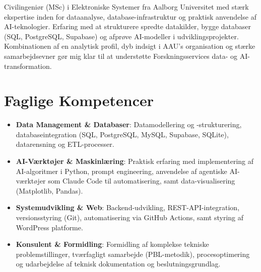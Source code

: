 \documentclass[11pt,a4paper,sans]{moderncv}
\begin{document}
\makecvtitle


\vspace{6pt}
\small{Civilingeniør (MSc) i Elektroniske Systemer fra Aalborg Universitet med stærk ekspertise inden for dataanalyse, database-infrastruktur og praktisk anvendelse af AI-teknologier. Erfaring med at strukturere spredte datakilder, bygge databaser (SQL, PostgreSQL, Supabase) og afprøve AI-modeller i udviklingsprojekter. Kombinationen af en analytisk profil, dyb indsigt i AAU's organisation og stærke samarbejdsevner gør mig klar til at understøtte Forskningsservices data- og AI-transformation.}


\section{Faglige Kompetencer}
\vspace{1pt}
\begin{itemize}

\item \textbf{Data Management \& Databaser}: Datamodellering og -strukturering, databaseintegration (SQL, PostgreSQL, MySQL, Supabase, SQLite), datarensning og ETL-processer.

\item \textbf{AI-Værktøjer \& Maskinlæring}: Praktisk erfaring med implementering af AI-algoritmer i Python, prompt engineering, anvendelse af agentiske AI-værktøjer som Claude Code til automatisering, samt data-visualisering (Matplotlib, Pandas).

\item \textbf{Systemudvikling \& Web}: Backend-udvikling, REST-API-integration, versionsstyring (Git), automatisering via GitHub Actions, samt styring af WordPress platforme.

\item \textbf{Konsulent \& Formidling}: Formidling af komplekse tekniske problemstillinger, tværfagligt samarbejde (PBL-metodik), procesoptimering og udarbejdelse af teknisk dokumentation og beslutningsgrundlag.

\end{itemize}

\end{document}
